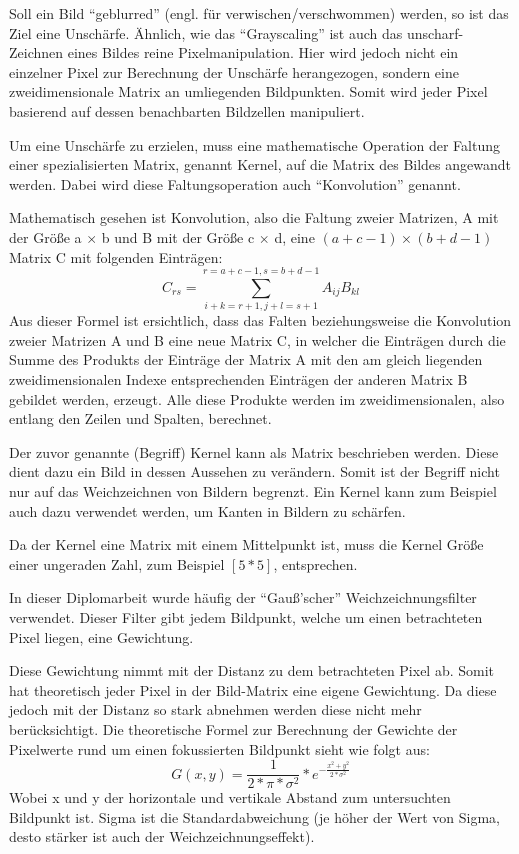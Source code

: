 Soll ein Bild ``geblurred'' (engl. für verwischen/verschwommen) werden, so ist das Ziel eine Unschärfe. Ähnlich, wie das ``Grayscaling'' ist auch das unscharf-Zeichnen eines Bildes reine Pixelmanipulation. Hier wird jedoch nicht ein einzelner Pixel zur Berechnung der Unschärfe herangezogen, sondern eine zweidimensionale Matrix an umliegenden Bildpunkten. Somit wird jeder Pixel basierend auf dessen benachbarten Bildzellen manipuliert.

Um eine Unschärfe zu erzielen, muss eine mathematische Operation der Faltung einer spezialisierten Matrix, genannt Kernel, auf die Matrix des Bildes angewandt werden. Dabei wird diese Faltungsoperation auch ``Konvolution'' genannt.

Mathematisch gesehen ist Konvolution, also die Faltung zweier Matrizen, A mit der Größe a \(\times\) b und B mit der Größe c \(\times\) d, eine \((a + c -1) \times (b + d - 1)\) Matrix C mit folgenden Einträgen:
\[
    C_{ rs } = \sum_{i+k=r+1, j+l=s+1}^{r=a+c-1,s = b + d - 1} A_{ ij }B_{ kl }
\]
Aus dieser Formel ist ersichtlich, dass das Falten beziehungsweise die Konvolution zweier Matrizen A und B eine neue Matrix C, in welcher die Einträgen durch die Summe des Produkts der Einträge der Matrix A mit den am gleich liegenden zweidimensionalen Indexe entsprechenden Einträgen der anderen Matrix B gebildet werden, erzeugt. Alle diese Produkte werden im zweidimensionalen, also entlang den Zeilen und Spalten, berechnet.

Der zuvor genannte (Begriff) Kernel kann als Matrix beschrieben werden. Diese dient dazu ein Bild in dessen Aussehen zu verändern. Somit ist der Begriff nicht nur auf das Weichzeichnen von Bildern begrenzt. Ein Kernel kann zum Beispiel auch dazu verwendet werden, um Kanten in Bildern zu schärfen.

Da der Kernel eine Matrix mit einem Mittelpunkt ist, muss die Kernel Größe einer ungeraden Zahl, zum Beispiel \([5*5]\), entsprechen.

In dieser Diplomarbeit wurde häufig der ``Gauß'scher'' Weichzeichnungsfilter verwendet. Dieser Filter gibt jedem Bildpunkt, welche um einen betrachteten Pixel liegen, eine Gewichtung.

Diese Gewichtung nimmt mit der Distanz zu dem betrachteten Pixel ab. Somit hat theoretisch jeder Pixel in der Bild-Matrix eine eigene Gewichtung. Da diese jedoch mit der Distanz so stark abnehmen werden diese nicht mehr berücksichtigt. Die theoretische Formel zur Berechnung der Gewichte der Pixelwerte rund um einen fokussierten Bildpunkt sieht wie folgt aus:
\[
    G(x,y)=\frac{ 1 }{ 2*\pi*\sigma^2 }*e^{ - \frac{ x^2 + y^2 }{ 2*\sigma^2 } }
\]
Wobei x und y der horizontale und vertikale Abstand zum untersuchten Bildpunkt ist. Sigma ist die Standardabweichung (je höher der Wert von Sigma, desto stärker ist auch der Weichzeichnungseffekt).

